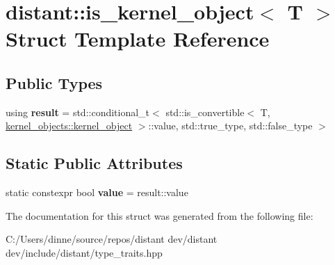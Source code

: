 \hypertarget{structdistant_1_1is__kernel__object}{}\section{distant\+:\+:is\+\_\+kernel\+\_\+object$<$ T $>$ Struct Template Reference}
\label{structdistant_1_1is__kernel__object}
\subsection*{Public Types}
\begin{DoxyCompactItemize}
\item 
\mbox{\label{structdistant_1_1is__kernel__object_a6d8a379fa5475e8f974817395ebe3dc7}} 
using {\bfseries result} = std\+::conditional\+\_\+t$<$ std\+::is\+\_\+convertible$<$ T, \mbox{\hyperlink{classdistant_1_1kernel__objects_1_1kernel__object}{kernel\+\_\+objects\+::kernel\+\_\+object}} $>$\+::value, std\+::true\+\_\+type, std\+::false\+\_\+type $>$
\end{DoxyCompactItemize}
\subsection*{Static Public Attributes}
\begin{DoxyCompactItemize}
\item 
\mbox{\label{structdistant_1_1is__kernel__object_a1addaa93158a790ca5bda1532b4f6c8a}} 
static constexpr bool {\bfseries value} = result\+::value
\end{DoxyCompactItemize}


The documentation for this struct was generated from the following file\+:\begin{DoxyCompactItemize}
\item 
C\+:/\+Users/dinne/source/repos/distant dev/distant dev/include/distant/type\+\_\+traits.\+hpp\end{DoxyCompactItemize}

